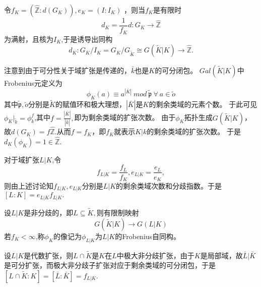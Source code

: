 \documentclass[UTF8]{article}
\begin{document}
令$f_{K}=(\widehat{\mathbb{Z}}:d(G_{K})),e_{K}=(I:I_{K})$
，则当$f_{K}$是有限时
$$
d_{K}=\frac{1}{f_{K}}d:G_{K}\rightarrow \widehat{\mathbb{Z}}
$$
为满射，且核为$I_{K}$,于是诱导出同构
$$
d_{K}:G_{K}/I_{K}=G_{K}/G_{\widetilde{K}}\cong G(\widetilde{K}|K)\rightarrow \widehat{\mathbb{Z}}.
$$

注意到由于可分性关于域扩张是传递的，$\bar{k}$也是$K$的可分闭包。
$Gal(\widetilde{K}|K)$中Frobenius元定义为
$$
\phi_{K}(a)\equiv a^{|\bar{K}|}\ mod \ \tilde{\mathfrak{p}}\ \forall \ a\in \tilde{o} 
$$
其中$\tilde{\mathfrak{p}},\tilde{o}$分别是$\widetilde{K}$的赋值环和极大理想，$|\bar{K}|$是$K$的剩余类域的元素个数。
于此可见$\phi_{K}|_{\tilde{k}}=\phi_{k}^{f}$,其中$
f=\frac{|\bar{K}|}{|\bar{k}|},$即为剩余类域的扩张次数。
由于$\phi_{K}$拓扑生成$G(\widetilde{K}|K)$，故$d(G_{K})=f\widehat{\mathbb{Z}}.$从而$f=f_{K}$，即$f_{K}$就表示$K|k$的剩余类域的扩张次数。
于是$d_{K}(\phi_{K})=1\in \widehat{\mathbb{Z}}$.

对于域扩张$L|K$,令
$$f_{L|K}=\frac{f_{L}}{f_{K}},e_{L|K}=\frac{e_{L}}{e_{K}},$$则由上述讨论知$f_{L|K},e_{L|K}$分别是$L|K$的剩余类域次数和分歧指数。于是$[L:K]=e_{L|K}f_{L|K}.$

设$L|K$是非分歧的，即$L\subseteq \widetilde{K},$则有限制映射
$$G(\widetilde{K}|K)\rightarrow G(L|K)$$
若$f_{K}< \infty $,称$\phi_{K}$的像记为$\phi_{L|K}$为$L|K$的Frobenius自同构。

设$L|K$是代数扩张，则$L\cap \widetilde{K}$是$K$在$L$中极大非分歧扩张，由于$K$是局部域，故$\bar{L}|\bar{K}$是可分扩张，而极大非分歧子扩张对应于剩余类域的可分闭包，于是$[L\cap \widetilde{K}:K]=[\bar{L}:\bar{K}]=f_{L|K}$.
\end{document}
